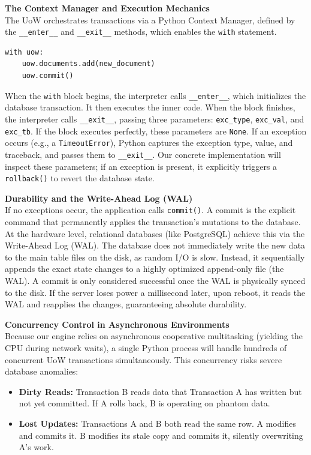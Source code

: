 \textbf{The Context Manager and Execution Mechanics} \\
The UoW orchestrates transactions via a Python Context Manager, defined by the \texttt{\_\_enter\_\_} and \texttt{\_\_exit\_\_} methods, which enables the \texttt{with} statement.

\begin{lstlisting}[caption={Context Manager Execution}]
with uow:
    uow.documents.add(new_document)
    uow.commit()
\end{lstlisting}

When the \texttt{with} block begins, the interpreter calls \texttt{\_\_enter\_\_}, which initializes the database transaction. It then executes the inner code. When the block finishes, the interpreter calls \texttt{\_\_exit\_\_}, passing three parameters: \texttt{exc\_type}, \texttt{exc\_val}, and \texttt{exc\_tb}. If the block executes perfectly, these parameters are \texttt{None}. If an exception occurs (e.g., a \texttt{TimeoutError}), Python captures the exception type, value, and traceback, and passes them to \texttt{\_\_exit\_\_}. Our concrete implementation will inspect these parameters; if an exception is present, it explicitly triggers a \texttt{rollback()} to revert the database state.

\textbf{Durability and the Write-Ahead Log (WAL)} \\
If no exceptions occur, the application calls \texttt{commit()}. A commit is the explicit command that permanently applies the transaction's mutations to the database. At the hardware level, relational databases (like PostgreSQL) achieve this via the Write-Ahead Log (WAL). The database does not immediately write the new data to the main table files on the disk, as random I/O is slow. Instead, it sequentially appends the exact state changes to a highly optimized append-only file (the WAL). A commit is only considered successful once the WAL is physically synced to the disk. If the server loses power a millisecond later, upon reboot, it reads the WAL and reapplies the changes, guaranteeing absolute durability.

\textbf{Concurrency Control in Asynchronous Environments} \\
Because our engine relies on asynchronous cooperative multitasking (yielding the CPU during network waits), a single Python process will handle hundreds of concurrent UoW transactions simultaneously. This concurrency risks severe database anomalies:
\begin{itemize}
    \item \textbf{Dirty Reads:} Transaction B reads data that Transaction A has written but not yet committed. If A rolls back, B is operating on phantom data.
    \item \textbf{Lost Updates:} Transactions A and B both read the same row. A modifies and commits it. B modifies its stale copy and commits it, silently overwriting A's work.
\end{itemize}

